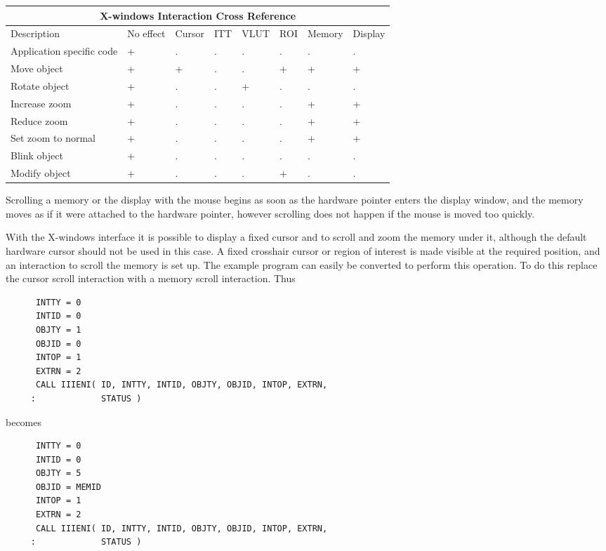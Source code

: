\begin{small}
\begin{center}
\begin{tabular}{|p{11em}||p{3.0em}||p{3.5em}||p{2.5em}|
                |p{3.5em}||p{3.5em}||p{3.7em}||p{3.5em}|}
\hline
\multicolumn{8}{|c|}{X-windows Interaction Cross Reference} \\ \hline \hline
Description & No effect & Cursor & ITT & VLUT & ROI & Memory & Display \\
\hline
Application specific code & + & . & . & . & . & . & . \\
Move object               & + & + & . & . & + & + & + \\
Rotate object             & + & . & . & + & . & . & . \\
Increase zoom             & + & . & . & . & . & + & + \\
Reduce zoom               & + & . & . & . & . & + & + \\
Set zoom to normal        & + & . & . & . & . & + & + \\
Blink object              & + & . & . & . & . & . & . \\
Modify object             & + & . & . & . & + & . & . \\
\hline
\end{tabular}
\end{center}
\end{small}

Scrolling a memory or the display with the mouse begins as soon as the
hardware pointer enters the display window, and the memory moves as
if it were attached to the hardware pointer, however scrolling does
not happen if the mouse is moved too quickly.

With the X-windows interface it is possible to display a fixed cursor
and to scroll and zoom the memory under it, although the default hardware
cursor should not be used in this case. A fixed crosshair cursor or region
of interest is made visible at the required position, and an interaction
to scroll the memory is set up. The example program can easily be converted
to perform this operation. To do this replace the cursor scroll interaction
with a memory scroll interaction. Thus
\begin{small}
\begin{verbatim}
      INTTY = 0
      INTID = 0
      OBJTY = 1
      OBJID = 0
      INTOP = 1
      EXTRN = 2
      CALL IIIENI( ID, INTTY, INTID, OBJTY, OBJID, INTOP, EXTRN,
     :             STATUS )
\end{verbatim}
\end{small}
becomes
\begin{small}
\begin{verbatim}
      INTTY = 0
      INTID = 0
      OBJTY = 5
      OBJID = MEMID
      INTOP = 1
      EXTRN = 2
      CALL IIIENI( ID, INTTY, INTID, OBJTY, OBJID, INTOP, EXTRN,
     :             STATUS )
\end{verbatim}
\end{small}

